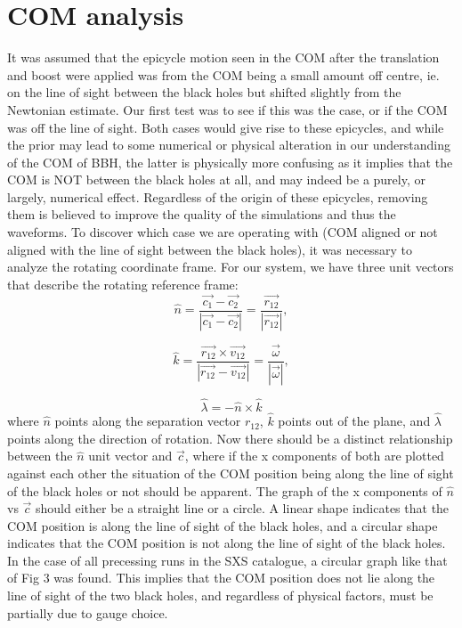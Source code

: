 \documentclass{article}
\begin{document}
\section{COM analysis}
It was assumed that the epicycle motion seen in the COM after the translation and boost were applied was from the COM being a small amount off centre, ie. on the line of sight between the black holes but shifted slightly from the Newtonian estimate.
Our first test was to see if this was the case, or if the COM was off the line of sight. Both cases would give rise to these epicycles, and while the prior may lead to some numerical or physical alteration in our understanding of the COM of BBH, the latter is physically more confusing as it implies that the COM is NOT between the black holes at all, and may indeed be a purely, or largely, numerical effect.
Regardless of the origin of these epicycles, removing them is believed to improve the quality of the simulations and thus the waveforms.
To discover which case we are operating with (COM aligned or not aligned with the line of sight between the black holes), it was necessary to analyze the rotating coordinate frame. For our system, we have three unit vectors that describe the rotating reference frame:
\begin{equation}
  \hat{n} = \frac{\vec{c_1} - \vec{c_2}}{|\vec{c_1} - \vec{c_2}|} = \frac{\vec{r_{12}}}{|\vec{r_{12}}|},
\end{equation}

\begin{equation}
  \hat{k} = \frac{\vec{r_{12}} \times \vec{v_{12}}}{|\vec{r_{12}}-\vec{v_{12}}|} = \frac{\vec{\omega}}{|\vec{\omega}|},
\end{equation}

\begin{equation}
 \hat{\lambda} = -\hat{n} \times \hat{k}
\end{equation}
where $\hat{n}$ points along the separation vector $r_{12}$, $\hat{k}$ points out of the plane, and $\hat{\lambda}$ points along the direction of rotation. Now there should be a distinct relationship between the $\hat{n}$ unit vector and $\vec{c}$, where if the x components of both are plotted against each other the situation of the COM position being along the line of sight of the black holes or not should be apparent. The graph of the x components of $\hat{n}$ vs $\vec{c}$ should either be a straight line or a circle. A linear shape indicates that the COM position is along the line of sight of the black holes, and a circular shape indicates that the COM position is not along the line of sight of the black holes.
In the case of all precessing runs in the SXS catalogue, a circular graph like that of Fig 3 was found. This implies that the COM position does not lie along the line of sight of the two black holes, and regardless of physical factors, must be partially due to gauge choice.
\end{document}
